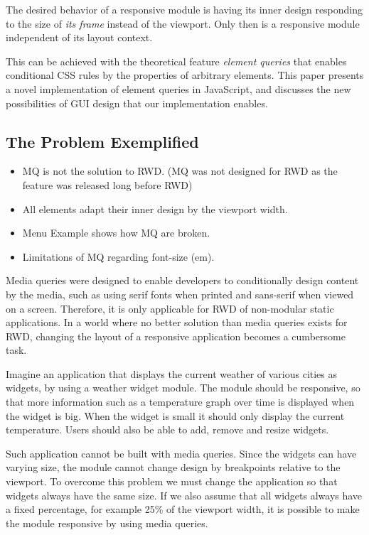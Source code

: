 \documentclass{acm_proc_article-sp}
\begin{document}
  The desired behavior of a responsive module is having its inner design responding to the size of \emph{its frame} instead of the viewport.
  Only then is a responsive module independent of its layout context.

  This can be achieved with the theoretical feature \emph{element queries} that enables conditional CSS rules by the properties of arbitrary elements.
  This paper presents a novel implementation of element queries in JavaScript, and discusses the new possibilities of GUI design that our implementation enables.

  \subsection{The Problem Exemplified}
    \begin{itemize}
      \item MQ is not the solution to RWD. (MQ was not designed for RWD as the feature was released long before RWD)
      \item All elements adapt their inner design by the viewport width.
      \item Menu Example shows how MQ are broken.
      \item Limitations of MQ regarding font-size (em).
    \end{itemize}

    Media queries were designed to enable developers to conditionally design content by the media, such as using serif fonts when printed and sans-serif when viewed on a screen.
    Therefore, it is only applicable for RWD of non-modular static applications.
    In a world where no better solution than media queries exists for RWD, changing the layout of a responsive application becomes a cumbersome task.
    
    Imagine an application that displays the current weather of various cities as widgets, by using a weather widget module.
    The module should be responsive, so that more information such as a temperature graph over time is displayed when the widget is big.
    When the widget is small it should only display the current temperature.
    Users should also be able to add, remove and resize widgets.

    Such application cannot be built with media queries.
    Since the widgets can have varying size, the module cannot change design by breakpoints relative to the viewport.
    To overcome this problem we must change the application so that widgets always have the same size.
    If we also assume that all widgets always have a fixed percentage, for example 25\% of the viewport width, it is possible to make the module responsive by using media queries.
\end{document}
